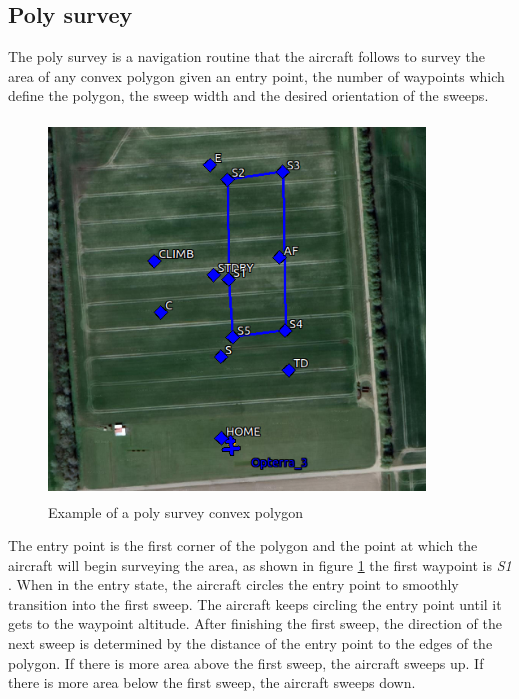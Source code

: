 \subsection{Poly survey}
The poly survey is a navigation routine that the aircraft follows to survey the area of any convex polygon given an entry point, the number of waypoints which define the polygon, the sweep width and the desired orientation of the sweeps.
\begin{figure}[H]
\centering
\includegraphics[width=10cm,height=10cm,keepaspectratio]{imagenes/Convex_polygon.png}
\caption{Example of a poly survey convex polygon}
\label{fig:Convex_poly}
\end{figure}
The entry point is the first corner of the polygon and the point at which the aircraft will begin surveying the area, as shown in figure \ref{fig:Convex_poly} the first waypoint is  \textit{S1} . When in the entry state, the aircraft circles the entry point to smoothly transition into the first sweep. The aircraft keeps circling the entry point until it gets to the waypoint altitude. After finishing the first sweep, the direction of the next sweep is determined by the distance of the entry point to the edges of the polygon. If there is more area above the first sweep, the aircraft sweeps up. If there is more area below the first sweep, the aircraft sweeps down.\cite{Poly_survey}

